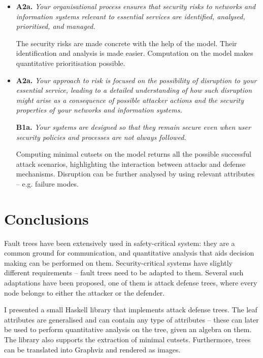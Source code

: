 \documentclass{scrreprt}
\begin{document}
\begin{itemize}
    \item 
        \textbf{A2a.} \textit{Your organisational process ensures that security
        risks to networks and information systems relevant to essential services
        are identified, analysed, prioritised, and managed.}

        The security risks are made concrete with the help of the model.  Their
        identification and analysis is made easier. Computation on the model
        makes quantitative prioritisation possible.

    \item
        \textbf{A2a.} \textit{Your approach to risk is focused on the
        possibility of disruption to your essential service, leading to a
        detailed understanding of how such disruption might arise as a
        consequence of possible attacker actions and the security properties of
        your networks and information systems.}

        \textbf{B1a.} \textit{Your systems are designed so that they remain
        secure even when user security policies and processes are not always
        followed.}

        Computing minimal cutsets on the model returns all the possible
        successful attack scenarios, highlighting the interaction between
        attacks and defense mechanisms. Disruption can be further analysed by
        using relevant attributes -- e.g. failure modes.
\end{itemize}

\chapter{Conclusions}
\label{conclusions}

Fault trees have been extensively used in safety-critical system: they are a
common ground for communication, and quantitative analysis that aids decision
making can be performed on them. Security-critical systems have slightly
different requirements -- fault trees need to be adapted to them. Several such
adaptations have been proposed, one of them is attack defense trees, where every
node belongs to either the attacker or the defender.

I presented a small Haskell library that implements attack defense trees. The
leaf attributes are generalised and can contain any type of attributes -- these
can later be used to perform quantitative analysis on the tree, given an algebra
on them.  The library also supports the extraction of minimal cutsets.
Furthermore, trees can be translated into Graphviz and rendered as images.
\end{document}
